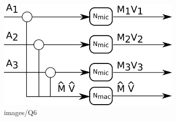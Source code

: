 \begin{figure}[H]
	\centering
	\includegraphics[width=0.8\textwidth]{images/Q6}
	\caption{images/Q6}
	\label{fig:images-Q6}
\end{figure}

